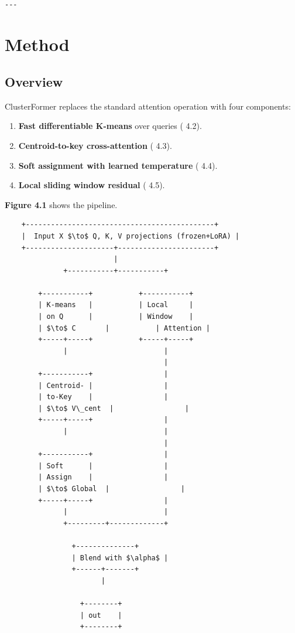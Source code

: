 \begin{lstlisting}

---
\end{lstlisting}

\section{Method}

\subsection{Overview}

ClusterFormer replaces the standard attention operation with four 
components:

\begin{enumerate}
\item \textbf{Fast differentiable K-means} over queries ( 4.2).
\item \textbf{Centroid-to-key cross-attention} ( 4.3).
\item \textbf{Soft assignment with learned temperature} ( 4.4).
\item \textbf{Local sliding window residual} ( 4.5).

\end{enumerate}
\textbf{Figure 4.1} shows the pipeline.

\begin{lstlisting}
    +---------------------------------------------+
    |  Input X $\to$ Q, K, V projections (frozen+LoRA) |
    +---------------------+-----------------------+
                          |
              +-----------+-----------+
                                       
        +-----------+           +-----------+
        | K-means   |           | Local     |
        | on Q      |           | Window    |
        | $\to$ C       |           | Attention |
        +-----+-----+           +-----+-----+
              |                       |
                                      |
        +-----------+                 |
        | Centroid- |                 |
        | to-Key    |                 |
        | $\to$ V\_cent  |                 |
        +-----+-----+                 |
              |                       |
                                      |
        +-----------+                 |
        | Soft      |                 |
        | Assign    |                 |
        | $\to$ Global  |                 |
        +-----+-----+                 |
              |                       |
              +---------+-------------+
                         
                +--------------+
                | Blend with $\alpha$ |
                +------+-------+
                       |
                        
                  +--------+
                  | out    |
                  +--------+
\end{lstlisting}

